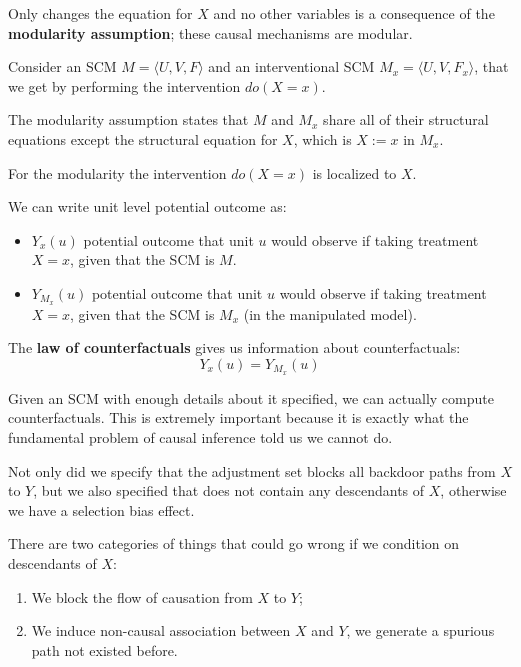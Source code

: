 Only changes the equation for $X$ and no other variables is a consequence of the
\textbf{modularity assumption}; these causal mechanisms are modular.

\begin{definition}
    Consider an SCM $M = \langle U, V, F \rangle$ and an interventional SCM
    $M_x =\langle U, V, F_x \rangle$, that we get by performing the intervention
    $do(X = x)$.

    The modularity assumption states that $M$ and $M_x$ share all of their
    structural equations except the structural equation for $X$, which is
    $X := x$ in $M_x$.
\end{definition}
For the modularity the intervention $do(X = x)$ is localized to $X$.

We can write unit level potential outcome as:
\begin{itemize}
    \item $Y_x (u)$ potential outcome that unit $u$ would observe if taking treatment
          $X = x$, given that the SCM is $M$.
    \item $Y_{M_x}(u)$ potential outcome that unit $u$ would observe if taking
          treatment $X = x$, given that the SCM is $M_x$ (in the manipulated model).
\end{itemize}

The \textbf{law of counterfactuals} gives us information about counterfactuals:
\begin{equation}
    Y_x(u) = Y_{M_x}(u)
\end{equation}

Given an SCM with enough details about it specified, we can actually compute
counterfactuals. This is extremely important because it is exactly what the
fundamental problem of causal inference told us we cannot do.

Not only did we specify that the adjustment set blocks all backdoor paths from
$X$ to $Y$, but we also specified that does not contain any descendants of $X$,
otherwise we have a selection bias effect.

There are two categories of things that could go wrong if we condition on descendants
of $X$:
\begin{enumerate}
    \item We block the flow of causation from $X$ to $Y$;
    \item We induce non-causal association between $X$ and $Y$, we generate a
          spurious path not existed before.
\end{enumerate}

